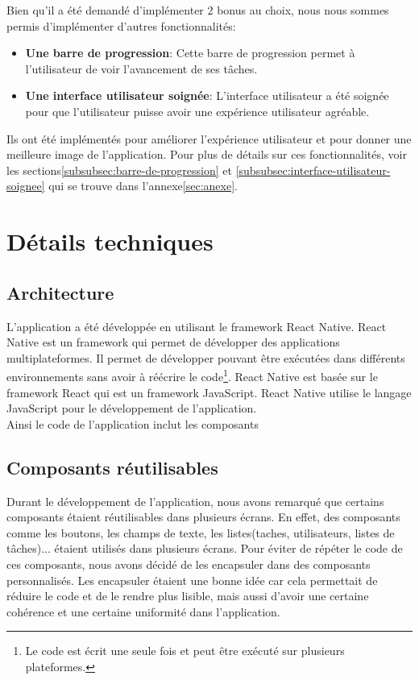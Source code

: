 \documentclass[12pt]{article}
\begin{document}
        Bien qu'il a été demandé d'implémenter 2 bonus au choix, nous nous sommes permis d'implémenter d'autres fonctionnalités:
        \begin{itemize}
            \item \textbf{Une barre de progression}: Cette barre de progression permet à l'utilisateur de voir l'avancement de ses tâches.
            \item \textbf{Une interface utilisateur soignée}: L'interface utilisateur a été soignée pour que l'utilisateur puisse avoir une expérience utilisateur agréable.
        \end{itemize}
        Ils ont été implémentés pour améliorer l'expérience utilisateur et pour donner une meilleure image de l'application. Pour
        plus de détails sur ces fonctionnalités, voir les sections\ref{subsubsec:barre-de-progression} et \ref{subsubsec:interface-utilisateur-soignee} qui se
         trouve dans l'annexe\ref{sec:anexe}.

        \section{Détails techniques}\label{sec:details-techniques}

        \subsection{Architecture}\label{subsec:architecture}
        L'application a été développée en utilisant le framework React Native. React Native est un framework qui permet de développer des applications multiplateformes.
        Il permet de développer pouvant être exécutées dans différents environnements sans avoir à réécrire le code\footnote{Le code est écrit une seule fois et peut être exécuté sur plusieurs plateformes.}.
        React Native est basée sur le framework React qui est un framework JavaScript. React Native utilise le langage JavaScript pour le développement de l'application.\\
        Ainsi le code de l'application inclut les composants



        \subsection{Composants réutilisables}\label{subsec:composants-reutilisables}
        Durant le développement de l'application, nous avons remarqué que certains composants étaient réutilisables dans plusieurs
        écrans. En effet, des composants comme les boutons, les champs de texte, les listes(taches, utilisateurs, listes de tâches)...
        étaient utilisés dans plusieurs écrans. Pour éviter de répéter le code de ces composants, nous avons décidé de les
        encapsuler dans des composants personnalisés. Les encapsuler étaient une bonne idée car cela permettait de réduire le code
        et de le rendre plus lisible, mais aussi d'avoir une certaine cohérence et une certaine uniformité dans l'application.
\end{document}
